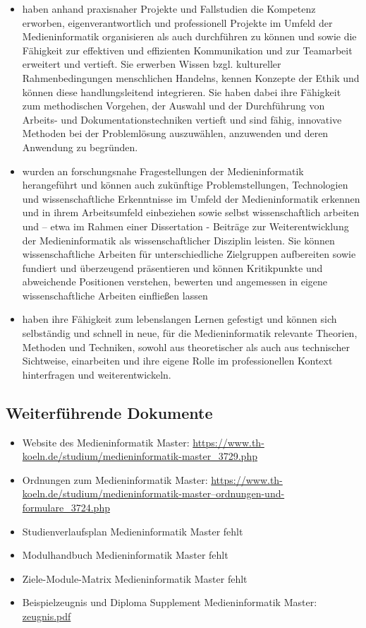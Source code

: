 \begin{itemize}
\item
  haben anhand praxisnaher Projekte und Fallstudien die Kompetenz
  erworben, eigenverantwortlich und professionell Projekte im Umfeld der
  Medieninformatik organisieren als auch durchführen zu können und sowie
  die Fähigkeit zur effektiven und effizienten Kommunikation und zur
  Teamarbeit erweitert und vertieft. Sie erwerben Wissen bzgl.
  kultureller Rahmenbedingungen menschlichen Handelns, kennen Konzepte
  der Ethik und können diese handlungsleitend integrieren. Sie haben
  dabei ihre Fähigkeit zum methodischen Vorgehen, der Auswahl und der
  Durchführung von Arbeits- und Dokumentationstechniken vertieft und
  sind fähig, innovative Methoden bei der Problemlösung auszuwählen,
  anzuwenden und deren Anwendung zu begründen.
\item
  wurden an forschungsnahe Fragestellungen der Medieninformatik
  herangeführt und können auch zukünftige Problemstellungen,
  Technologien und wissenschaftliche Erkenntnisse im Umfeld der
  Medieninformatik erkennen und in ihrem Arbeitsumfeld einbeziehen sowie
  selbst wissenschaftlich arbeiten und -- etwa im Rahmen einer
  Dissertation - Beiträge zur Weiterentwicklung der Medieninformatik als
  wissenschaftlicher Disziplin leisten. Sie können wissenschaftliche
  Arbeiten für unterschiedliche Zielgruppen aufbereiten sowie fundiert
  und überzeugend präsentieren und können Kritikpunkte und abweichende
  Positionen verstehen, bewerten und angemessen in eigene
  wissenschaftliche Arbeiten einfließen lassen
\item
  haben ihre Fähigkeit zum lebenslangen Lernen gefestigt und können sich
  selbständig und schnell in neue, für die Medieninformatik relevante
  Theorien, Methoden und Techniken, sowohl aus theoretischer als auch
  aus technischer Sichtweise, einarbeiten und ihre eigene Rolle im
  professionellen Kontext hinterfragen und weiterentwickeln.
\end{itemize}

\subsection{Weiterführende
Dokumente}\label{weiterfuxfchrende-dokumente-1}

\begin{itemize}
\tightlist
\item
  Website des Medieninformatik Master:
  \url{https://www.th-koeln.de/studium/medieninformatik-master_3729.php}
\item
  Ordnungen zum Medieninformatik Master:
  \href{https://www.th-koeln.de/studium/medieninformatik-master--ordnungen-und-formulare_3724.php}{https://www.th-koeln.de/studium/medieninformatik-master--ordnungen-und-formulare\_3724.php}
\item
  Studienverlaufsplan Medieninformatik Master fehlt
\item
  Modulhandbuch Medieninformatik Master fehlt
\item
  Ziele-Module-Matrix Medieninformatik Master fehlt
\item
  Beispielzeugnis und Diploma Supplement Medieninformatik Master:
  \href{../anhaenge/ma-zeugnis.pdf}{zeugnis.pdf}
\end{itemize}

